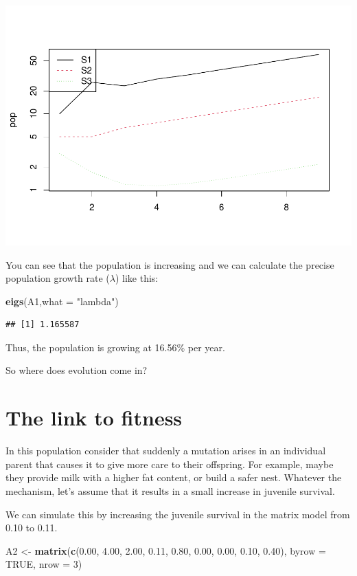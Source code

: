 \documentclass[
  a4paper]{book}
\newenvironment{Shaded}{\begin{snugshade}}{\end{snugshade}}
\newcommand{\AttributeTok}[1]{\textcolor[rgb]{0.13,0.29,0.53}{#1}}
\newcommand{\ConstantTok}[1]{\textcolor[rgb]{0.56,0.35,0.01}{#1}}
\newcommand{\DecValTok}[1]{\textcolor[rgb]{0.00,0.00,0.81}{#1}}
\newcommand{\FloatTok}[1]{\textcolor[rgb]{0.00,0.00,0.81}{#1}}
\newcommand{\FunctionTok}[1]{\textcolor[rgb]{0.13,0.29,0.53}{\textbf{#1}}}
\newcommand{\NormalTok}[1]{#1}
\newcommand{\OtherTok}[1]{\textcolor[rgb]{0.56,0.35,0.01}{#1}}
\newcommand{\StringTok}[1]{\textcolor[rgb]{0.31,0.60,0.02}{#1}}
\begin{document}
\includegraphics{BB512_files/figure-latex/unnamed-chunk-91-1.pdf}

You can see that the population is increasing and we can calculate the precise population growth rate (\(\lambda\)) like this:

\begin{Shaded}
\begin{Highlighting}[]
\FunctionTok{eigs}\NormalTok{(A1,}\AttributeTok{what =} \StringTok{"lambda"}\NormalTok{)}
\end{Highlighting}
\end{Shaded}

\begin{verbatim}
## [1] 1.165587
\end{verbatim}

Thus, the population is growing at 16.56\% per year.

So where does evolution come in?

\section{The link to fitness}\label{the-link-to-fitness}

In this population consider that suddenly a mutation arises in an individual parent that causes it to give more care to their offspring. For example, maybe they provide milk with a higher fat content, or build a safer nest. Whatever the mechanism, let's assume that it results in a small increase in juvenile survival.

We can simulate this by increasing the juvenile survival in the matrix model from 0.10 to 0.11.

\begin{Shaded}
\begin{Highlighting}[]
\NormalTok{A2 }\OtherTok{\textless{}{-}} \FunctionTok{matrix}\NormalTok{(}\FunctionTok{c}\NormalTok{(}\FloatTok{0.00}\NormalTok{, }\FloatTok{4.00}\NormalTok{, }\FloatTok{2.00}\NormalTok{, }
               \FloatTok{0.11}\NormalTok{, }\FloatTok{0.80}\NormalTok{, }\FloatTok{0.00}\NormalTok{, }
               \FloatTok{0.00}\NormalTok{, }\FloatTok{0.10}\NormalTok{, }\FloatTok{0.40}\NormalTok{), }
            \AttributeTok{byrow =} \ConstantTok{TRUE}\NormalTok{, }\AttributeTok{nrow =} \DecValTok{3}\NormalTok{)}
\end{Highlighting}
\end{Shaded}
\end{document}
